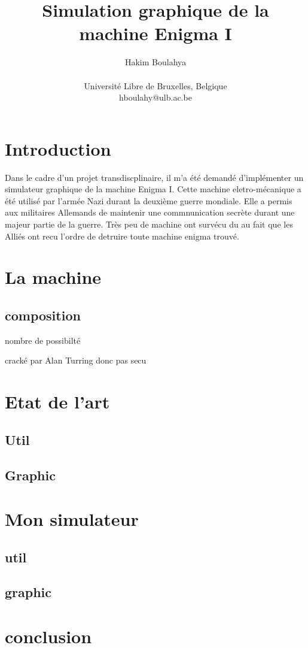 \documentclass[letterpaper]{article}
\title{Simulation graphique de la machine Enigma I}
\author{Hakim Boulahya \\
\mbox{}\\
Université Libre de Bruxelles, Belgique\\
hboulahy@ulb.ac.be}
\begin{document}
\maketitle

\begin{abstract}
\end{abstract}

\section{Introduction}
Dans le cadre d'un projet transdiscplinaire, il m'a été demandé d'implémenter
un simulateur graphique de la machine Enigma I. Cette machine eletro-mécanique a été utilisé par
l'armée Nazi durant la deuxième guerre mondiale. Elle a permis aux militaires Allemands
de maintenir une commnunication secrète durant une majeur partie de la guerre. Très peu
de machine ont survécu du au fait que les Alliés ont recu l'ordre de detruire toute machine
enigma trouvé.

\section{La machine}

\subsection{composition}

nombre de possibilté

cracké par Alan Turring donc pas secu

\section{Etat de l'art}
\subsection{Util}
\subsection{Graphic}

\section{Mon simulateur}

\subsection{util}
\subsection{graphic}

\section{conclusion}

\footnotesize


\end{document}
